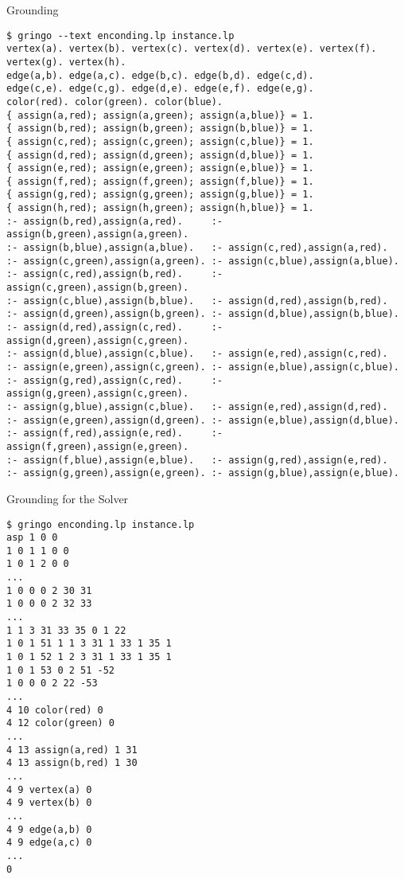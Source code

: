 \begin{frame}[fragile,shrink=1]{Grounding}
\begin{lstlisting}
$ gringo --text enconding.lp instance.lp
vertex(a). vertex(b). vertex(c). vertex(d). vertex(e). vertex(f). vertex(g). vertex(h).
edge(a,b). edge(a,c). edge(b,c). edge(b,d). edge(c,d).
edge(c,e). edge(c,g). edge(d,e). edge(e,f). edge(e,g).
color(red). color(green). color(blue).
{ assign(a,red); assign(a,green); assign(a,blue)} = 1.
{ assign(b,red); assign(b,green); assign(b,blue)} = 1.
{ assign(c,red); assign(c,green); assign(c,blue)} = 1.
{ assign(d,red); assign(d,green); assign(d,blue)} = 1.
{ assign(e,red); assign(e,green); assign(e,blue)} = 1.
{ assign(f,red); assign(f,green); assign(f,blue)} = 1.
{ assign(g,red); assign(g,green); assign(g,blue)} = 1.
{ assign(h,red); assign(h,green); assign(h,blue)} = 1.
:- assign(b,red),assign(a,red).     :- assign(b,green),assign(a,green).
:- assign(b,blue),assign(a,blue).   :- assign(c,red),assign(a,red).
:- assign(c,green),assign(a,green). :- assign(c,blue),assign(a,blue).
:- assign(c,red),assign(b,red).     :- assign(c,green),assign(b,green).
:- assign(c,blue),assign(b,blue).   :- assign(d,red),assign(b,red).
:- assign(d,green),assign(b,green). :- assign(d,blue),assign(b,blue).
:- assign(d,red),assign(c,red).     :- assign(d,green),assign(c,green).
:- assign(d,blue),assign(c,blue).   :- assign(e,red),assign(c,red).
:- assign(e,green),assign(c,green). :- assign(e,blue),assign(c,blue).
:- assign(g,red),assign(c,red).     :- assign(g,green),assign(c,green).
:- assign(g,blue),assign(c,blue).   :- assign(e,red),assign(d,red).
:- assign(e,green),assign(d,green). :- assign(e,blue),assign(d,blue).
:- assign(f,red),assign(e,red).     :- assign(f,green),assign(e,green).
:- assign(f,blue),assign(e,blue).   :- assign(g,red),assign(e,red).
:- assign(g,green),assign(e,green). :- assign(g,blue),assign(e,blue).
\end{lstlisting}
\end{frame}

\begin{frame}[fragile,shrink=1]{Grounding for the Solver}
\begin{lstlisting}
$ gringo enconding.lp instance.lp
asp 1 0 0
1 0 1 1 0 0
1 0 1 2 0 0
...
1 0 0 0 2 30 31
1 0 0 0 2 32 33
...
1 1 3 31 33 35 0 1 22
1 0 1 51 1 1 3 31 1 33 1 35 1
1 0 1 52 1 2 3 31 1 33 1 35 1
1 0 1 53 0 2 51 -52
1 0 0 0 2 22 -53
...
4 10 color(red) 0
4 12 color(green) 0
...
4 13 assign(a,red) 1 31
4 13 assign(b,red) 1 30
...
4 9 vertex(a) 0
4 9 vertex(b) 0
...
4 9 edge(a,b) 0
4 9 edge(a,c) 0
...
0
\end{lstlisting}
\end{frame}

